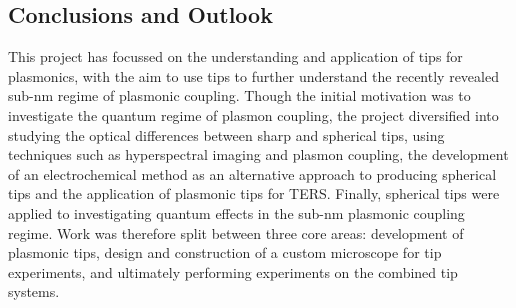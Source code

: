 \documentclass[12pt, a4paper, oneside]{book}
\begin{document}
\begin{singlespace}
\color{white}
\chapter{Conclusions and Outlook}
\end{singlespace}


This project has focussed on the understanding and application of tips for plasmonics, with the aim to use tips to further understand the recently revealed sub-nm regime of plasmonic coupling. Though the initial motivation was to investigate the quantum regime of plasmon coupling, the project diversified into studying the optical differences between sharp and spherical tips, using techniques such as hyperspectral imaging and plasmon coupling, the development of an electrochemical method as an alternative approach to producing spherical tips and the application of plasmonic tips for TERS. Finally, spherical tips were applied to investigating quantum effects in the sub-nm plasmonic coupling regime. Work was therefore split between three core areas: development of plasmonic tips, design and construction of a custom microscope for tip experiments, and ultimately performing experiments on the combined tip systems.
\end{document}
